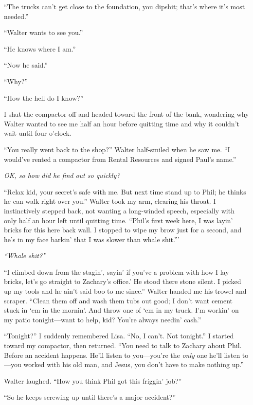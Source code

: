 ``The trucks can't get close to the foundation, you dipshit; that's
where it's most needed.''

``Walter wants to see you.''

``He knows where I am.''

``Now he said.''

``Why?''

``How the hell do I know?''

I shut the compactor off and headed toward the front of the bank,
wondering why Walter wanted to see me half an hour before quitting time
and why it couldn't wait until four o'clock.

``You really went back to the shop?'' Walter half-smiled when he saw me.
``I would've rented a compactor from Rental Resources and signed Paul's
name.''

\emph{OK, so how did he find out so quickly?}

``Relax kid, your secret's safe with me. But next time stand up to Phil;
he thinks he can walk right over you.'' Walter took my arm, clearing his
throat. I instinctively stepped back, not wanting a long-winded speech,
especially with only half an hour left until quitting time. ``Phil's
first week here, I was layin' bricks for this here back wall. I stopped
to wipe my brow just for a second, and he's in my face barkin' that I
was slower than whale shit.'''

\emph{``Whale shit?''}

``I climbed down from the stagin', sayin' if you've a problem with how I
lay bricks, let's go straight to Zachary's office.' He stood there stone
silent. I picked up my tools and he ain't said boo to me since.'' Walter
handed me his trowel and scraper. ``Clean them off and wash them tubs
out good; I don't want cement stuck in `em in the mornin'. And throw one
of `em in my truck. I'm workin' on my patio tonight---want to help, kid?
You're always needin' cash.''

``Tonight?'' I suddenly remembered Lisa. ``No, I can't. Not tonight.'' I
started toward my compactor, then returned. ``You need to talk to
Zachary about Phil. Before an accident happens. He'll listen to
you---you're the \emph{only} one he'll listen to---you worked with his
old man, and Jesus, you don't have to make nothing up.''

Walter laughed. ``How you think Phil got this friggin' job?''

``So he keeps screwing up until there's a major accident?''

